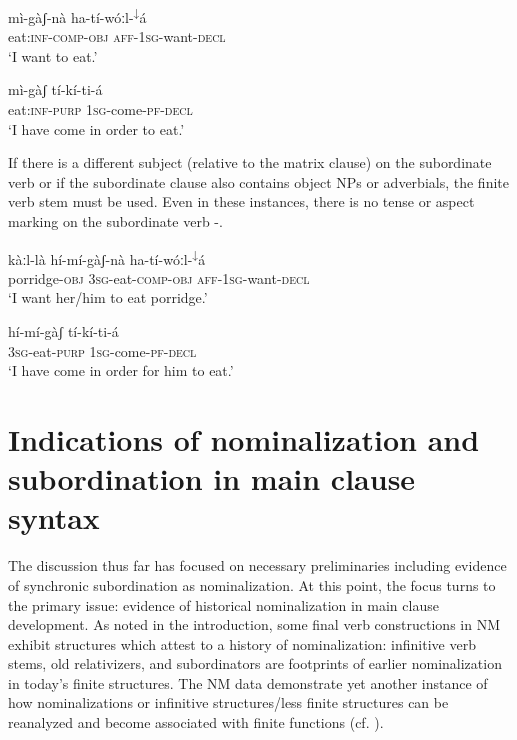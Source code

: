 \documentclass[output=paper]{langsci/langscibook}
\begin{document}
\ea\label{ex:mahland:48}
\gll m\`{i}-g\`{a}ʃ-n\`{a}              ha-t\'{i}-w\'{o}ːl-\textsuperscript{↓}\'{a}  \\
eat:\textsc{inf-comp-obj   aff-1sg}{}-want-\textsc{decl}   \\
\glt `I want to eat.'
\z

\ea\label{ex:mahland:49}
\gll m\`{i}-g\`{a}ʃ            t\'{i}-k\'{i}-ti-\'{a}\\
eat:\textsc{inf-purp   1sg}{}-come\textsc{{}-pf-decl} \\
\glt `I have come in order to eat.'
\z

If there is a different subject (relative to the matrix clause) on the subordinate verb or if the subordinate clause also contains object NPs or adverbials, the finite verb stem must be used. Even in these instances, there is no tense or aspect marking on the subordinate verb -.

\ea\label{ex:mahland:50}
\gll k\`{a}ːl-l\`{a}            h\'{i}-m\'{i}-g\`{a}ʃ-n\`{a}           ha-t\'{i}-w\'{o}ːl-\textsuperscript{↓}\'{a}  \\
porridge-\textsc{obj   3sg-}eat-\textsc{comp-obj   aff-1sg-}want-\textsc{decl}  \\
\glt `I want her/him to eat porridge.'
\z

\ea\label{ex:mahland:51}
\gll h\'{i}-m\'{i}-g\`{a}ʃ          t\'{i}-k\'{i}-ti-\'{a}\\
\textsc{3sg}{}-eat-\textsc{purp   1sg}{}-come-\textsc{pf-decl} \\
\glt `I have come in order for him to eat.'
\z

\section{Indications of nominalization and subordination in main clause syntax}\label{sec:mahland:3}

The discussion thus far has focused on necessary preliminaries including evidence of synchronic subordination as nominalization. At this point, the focus turns to the primary issue: evidence of historical nominalization in main clause development. As noted in the introduction, some final verb constructions in NM exhibit structures which attest to a history of nominalization: infinitive verb stems, old relativizers, and subordinators are footprints of earlier nominalization in today's finite structures. The NM data demonstrate yet another instance of how nominalizations or infinitive structures/less finite structures can be reanalyzed and become associated with finite functions (cf. \citealt{Givon2009, DeLancey2011}).
\end{document}
